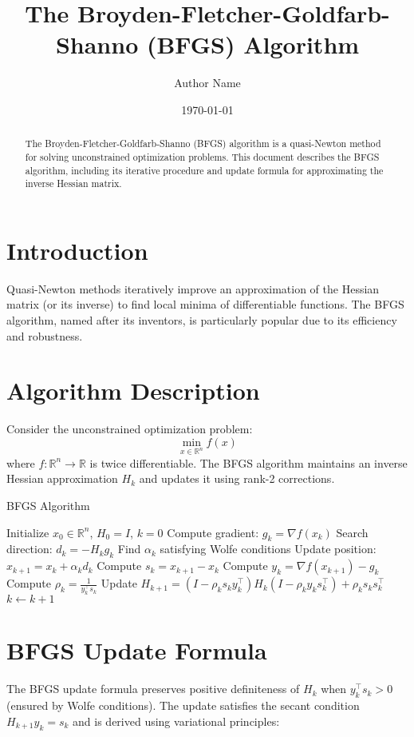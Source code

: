 \documentclass{article}
\title{The Broyden-Fletcher-Goldfarb-Shanno (BFGS) Algorithm}
\author{Author Name}
\date{\today}
\begin{document}
\maketitle

\begin{abstract}
The Broyden-Fletcher-Goldfarb-Shanno (BFGS) algorithm is a quasi-Newton method for solving unconstrained optimization problems. This document describes the BFGS algorithm, including its iterative procedure and update formula for approximating the inverse Hessian matrix.
\end{abstract}

\section{Introduction}
Quasi-Newton methods iteratively improve an approximation of the Hessian matrix (or its inverse) to find local minima of differentiable functions. The BFGS algorithm, named after its inventors, is particularly popular due to its efficiency and robustness.

\section{Algorithm Description}
Consider the unconstrained optimization problem:
\[
\min_{x \in \mathbb{R}^n} f(x)
\]
where \( f: \mathbb{R}^n \to \mathbb{R} \) is twice differentiable. The BFGS algorithm maintains an inverse Hessian approximation \( H_k \) and updates it using rank-2 corrections.

\begin{algorithm}
\caption{BFGS Algorithm}
\begin{algorithmic}[1]
\State Initialize \( x_0 \in \mathbb{R}^n \), \( H_0 = I \), \( k = 0 \)
   \State Compute gradient: \( g_k = \nabla f(x_k) \)
   \State Search direction: \( d_k = -H_k g_k \)
   \State Find \( \alpha_k \) satisfying Wolfe conditions
   \State Update position: \( x_{k+1} = x_k + \alpha_k d_k \)
   \State Compute \( s_k = x_{k+1} - x_k \)
   \State Compute \( y_k = \nabla f(x_{k+1}) - g_k \)
   \State Compute \( \rho_k = \frac{1}{y_k^\top s_k} \)
   \State Update \( H_{k+1} = (I - \rho_k s_k y_k^\top) H_k (I - \rho_k y_k s_k^\top) + \rho_k s_k s_k^\top \)
   \State \( k \leftarrow k + 1 \)
\EndWhile
\end{algorithmic}
\end{algorithm}

\section{BFGS Update Formula}
The BFGS update formula preserves positive definiteness of \( H_k \) when \( y_k^\top s_k > 0 \) (ensured by Wolfe conditions). The update satisfies the secant condition \( H_{k+1} y_k = s_k \) and is derived using variational principles:
\end{document}
